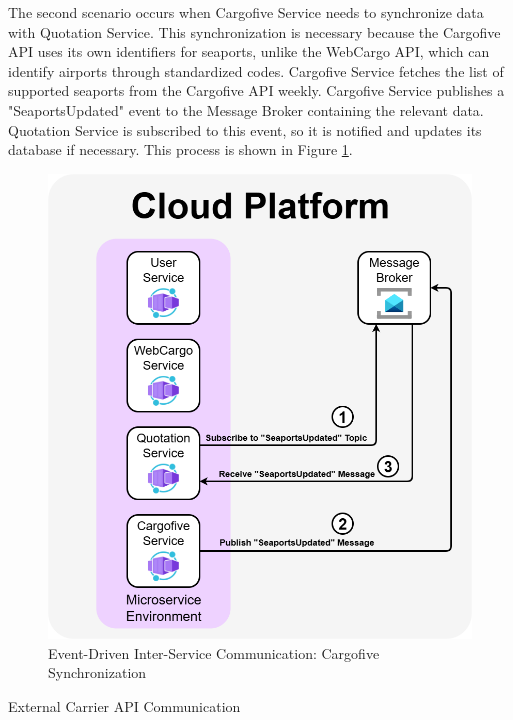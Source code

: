 \documentclass[12pt,reqno, oneside]{amsbook}
\makeatletter
\def\subsection{\@startsection{subsection}{2}%
      \z@{.5\linespacing\@plus.7\linespacing}{.25\linespacing}%
      {\normalfont\bfseries\flushleft}}
\theoremstyle{definition}
\theoremstyle{definition}
\numberwithin{section}{chapter}
\numberwithin{table}{chapter}
\numberwithin{figure}{chapter}
\makeatother
\begin{document}
\pagebreak

The second scenario occurs when Cargofive Service needs to synchronize data with Quotation Service. This synchronization is necessary because the Cargofive \Ac{API} uses its own identifiers for seaports, unlike the WebCargo \ac{API}, which can identify airports through standardized codes. Cargofive Service fetches the list of supported seaports from the Cargofive \ac{API} weekly. Cargofive Service publishes a "SeaportsUpdated" event to the Message Broker containing the relevant data. Quotation Service is subscribed to this event, so it is notified and updates its database if necessary. This process is shown in Figure \ref{Figure:EventDrivenCommunicationCargofive}.

\begin{figure}[H]
  \centering
  \includegraphics[width=0.9\linewidth]{images/EventDrivenCommunicationCargofive.png}
  \caption{\label{Figure:EventDrivenCommunicationCargofive}Event-Driven Inter-Service Communication: Cargofive Synchronization}
\end{figure}

\pagebreak

\subsection{External Carrier API Communication}
\end{document}
